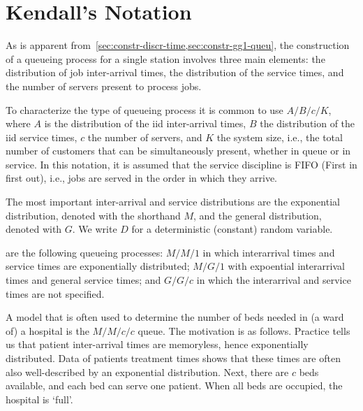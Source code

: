 
\section{Kendall's Notation}
\label{sec:kendalls-notation}

As is apparent from~\cref{sec:constr-discr-time,sec:constr-gg1-queu}, the construction of a queueing process for a single station involves three main elements: the distribution of job inter-arrival times, the distribution of the service times, and the number of servers present to process jobs.



To characterize the type of queueing process it is common to use
 $A/B/c/K$, where $A$ is the distribution of the
iid inter-arrival times, $B$ the distribution of the iid service times, $c$ the
number of servers, and $K$ the system size, i.e., the total number of customers that can be simultaneously present, whether in queue or in service.
In this notation, it is assumed that the  service discipline is FIFO (First in first out), i.e., jobs are served in the order in which they arrive.


The most important inter-arrival and service distributions are the exponential distribution, denoted with the shorthand  $M$, and the general distribution,  denoted with  $G$. We write $D$ for a deterministic (constant) random variable.

 are the following queueing processes: $M/M/1$ in which interarrival times and service times are exponentially distributed;  $M/G/1$ with expoential interarrival times and general service times; and $G/G/c$ in which the interarrival and service times are not specified.

A model that is often used to determine the number of beds needed in (a ward of) a hospital is the $M/M/c/c$ queue.
The motivation is as follows.
Practice tells us that patient inter-arrival times are memoryless, hence exponentially distributed.
Data of patients treatment times shows that these times are often also well-described by an exponential distribution.
Next, there are $c$ beds available, and each bed can serve one patient. When all beds are occupied, the hospital is `full'.


